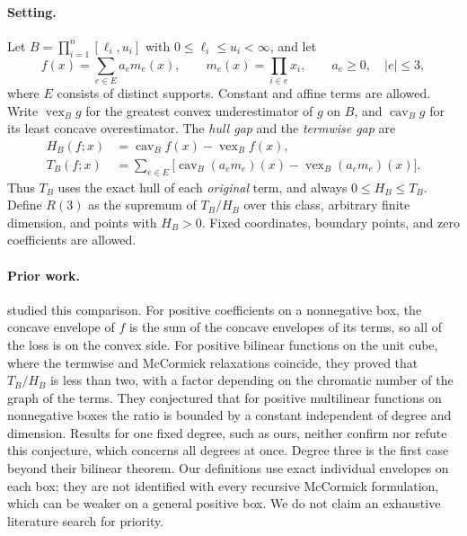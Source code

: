\documentclass[11pt]{article}
\theoremstyle{remark}
\DeclareMathOperator{\vex}{vex}
\DeclareMathOperator{\cav}{cav}
\begin{document}
\paragraph{Setting.}
Let $B=\prod_{i=1}^n[\ell_i,u_i]$ with $0\le\ell_i\le u_i<\infty$, and let
\[
 f(x)=\sum_{e\in E}a_em_e(x),\qquad m_e(x)=\prod_{i\in e}x_i,
 \qquad a_e\ge0,\quad |e|\le3,
\]
where $E$ consists of distinct supports. Constant and affine terms are
allowed. Write $\vex_B g$ for the greatest convex underestimator of $g$
on $B$, and $\cav_B g$ for its least concave overestimator. The
\emph{hull gap} and the \emph{termwise gap} are
\begin{align*}
 H_B(f;x)&=\cav_B f(x)-\vex_B f(x),\\
 T_B(f;x)&=\sum_{e\in E}\bigl[\cav_B(a_em_e)(x)-\vex_B(a_em_e)(x)\bigr].
\end{align*}
Thus $T_B$ uses the exact hull of each \emph{original} term, and always
$0\le H_B\le T_B$. Define $R(3)$ as the supremum of $T_B/H_B$ over this
class, arbitrary finite dimension, and points with $H_B>0$. Fixed
coordinates, boundary points, and zero coefficients are allowed.

\paragraph{Prior work.}
\citet{Luedtke2012} studied this comparison. For positive coefficients on
a nonnegative box, the concave envelope of $f$ is the sum of the concave
envelopes of its terms, so all of the loss is on the convex side. For
positive bilinear functions on the unit cube, where the termwise and
McCormick relaxations coincide, they proved that $T_B/H_B$ is less than
two, with a factor depending on the chromatic number of the graph of the
terms. They conjectured that for positive multilinear functions on
nonnegative boxes the ratio is bounded by a constant independent of
degree and dimension. Results for one fixed degree, such as ours,
neither confirm nor refute this conjecture, which concerns all degrees at
once. Degree three is the first case beyond their bilinear theorem. Our definitions use exact individual envelopes on each
box; they are not identified with every recursive McCormick formulation,
which can be weaker on a general positive box. We do not claim an
exhaustive literature search for priority.
\end{document}
